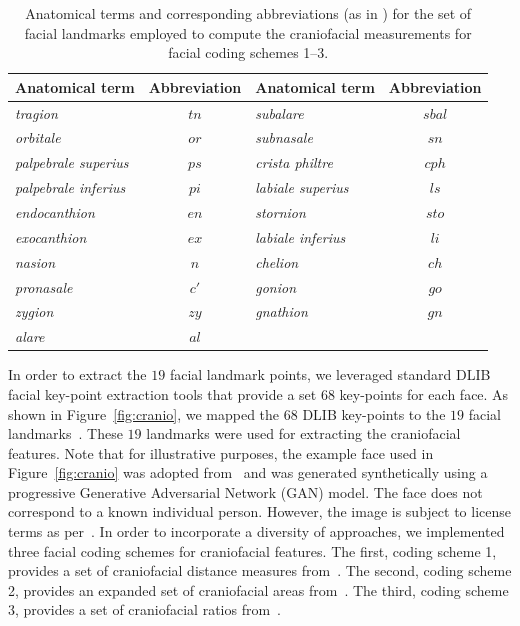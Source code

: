 \documentclass[letterpaper,11pt]{article}
\begin{document}
\begin{table}[ht]
\centering
\begin{tabular}{|lc|lc|}
    \hline 
   \bf Anatomical term & \bf Abbreviation  & \bf Anatomical term & \bf Abbreviation\\
     \hline  \hline
    {\it tragion} & $tn$ & {\it subalare} &$sbal$ \\ \hline
    {\it orbitale} &  $or$ & {\it subnasale} & $sn$\\ \hline
    {\it palpebrale superius} & $ps$ & {\it crista philtre} &$cph$\\ \hline
    {\it palpebrale inferius} & $pi$ & {\it labiale superius} &$ls$ \\ \hline
    {\it endocanthion} & $en$ & {\it stornion} & $sto$\\ \hline
    {\it exocanthion} & $ex$ & {\it labiale inferius} & $li$\\ \hline
    {\it nasion} & $n$  & {\it chelion}& $ch$  \\ \hline
    {\it pronasale} & $c'$ & {\it gonion} & $go$\\ \hline
    {\it zygion} & $zy$ & {\it gnathion} & $gn$ \\ \hline
    {\it alare} &$al$ & & \\ \hline
    \end{tabular}
    \caption{Anatomical terms and corresponding abbreviations (as in \cite{anthropometry_book94}) for the set of facial landmarks employed to compute the craniofacial measurements for facial coding schemes 1--3.}
    \label{tab:landmarks}
\end{table}

In order to extract the $19$ facial landmark points, we leveraged standard DLIB facial key-point extraction tools that provide a set $68$ key-points for each face.  As shown in Figure~\ref{fig:cranio}, we mapped the $68$ DLIB key-points to the $19$ facial landmarks~\cite{anthropometry_book94}.  These $19$ landmarks were used for extracting the craniofacial features.  Note that for illustrative purposes, the example face used in Figure~\ref{fig:cranio} was adopted from~\cite{progressiveGAN_ICLR18} and was generated synthetically using a progressive Generative Adversarial Network (GAN) model.  The face does not correspond to a known individual person.  However, the image is subject to license terms as per~\cite{progressiveGAN_ICLR18}.  In order to incorporate a diversity of approaches, we implemented three facial coding schemes for craniofacial features.  The first, coding scheme 1, provides a set of craniofacial distance measures from~\cite{anthropometry_book94}.  The second, coding scheme 2, provides an expanded set of craniofacial areas from~\cite{anthropmetry05}.  The third, coding scheme 3, provides a set of craniofacial ratios from~\cite{face_age_modeling06}.
\end{document}
